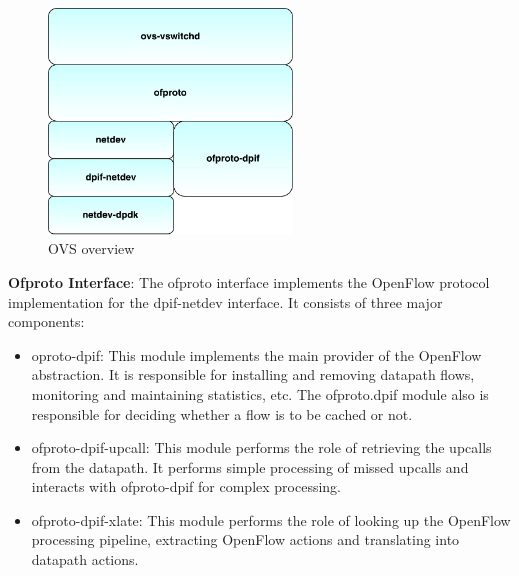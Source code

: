  \begin{figure}[H] 
 \centering   
 \caption{OVS overview}
 \includegraphics[height=6cm]{internals.pdf}
\end{figure}

\textbf{Ofproto Interface}: The ofproto interface implements the OpenFlow protocol implementation for the dpif-netdev interface. It consists of three major components:
\begin{itemize}
 \item oproto-dpif: This module implements the main provider of the OpenFlow abstraction. It is responsible for installing and removing datapath flows, monitoring and maintaining statistics, etc. The ofproto.dpif module also is responsible for deciding whether a flow is to be cached or not.
 \item ofproto-dpif-upcall: This module performs the role of retrieving the upcalls from the datapath. It performs simple processing of missed upcalls and interacts with ofproto-dpif for complex processing.
 \item ofproto-dpif-xlate: This module performs the role of looking up the OpenFlow processing pipeline, extracting OpenFlow actions and translating into datapath actions.
\end{itemize}

